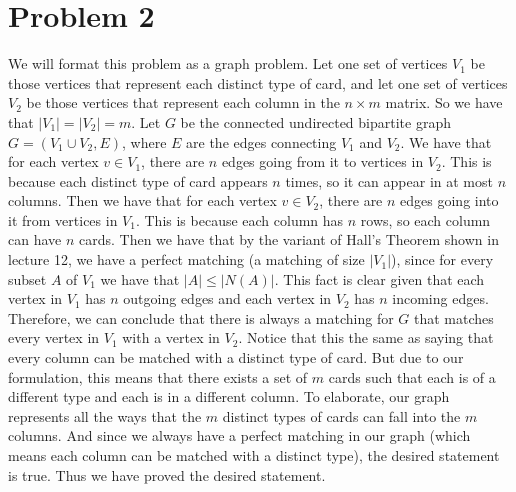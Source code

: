 \documentclass{article}
\begin{document}
\section*{Problem 2}
We will format this problem as a graph problem. Let one set of vertices $V_1$
be those vertices that represent each distinct type of card, and let one set
of vertices $V_2$ be those vertices that represent each column in the
$n \times m$ matrix. So we have that $|V_1| = |V_2| = m$. Let $G$ be the
connected undirected bipartite graph $G = (V_1 \cup V_2, E)$, where $E$ are the
edges connecting $V_1$ and $V_2$. We have that for each vertex $v \in V_1$,
there are $n$ edges going from it to vertices in $V_2$. This is because each
distinct type of card appears $n$ times, so it can appear in at most $n$
columns. Then we have that for each vertex $v \in V_2$, there are $n$ edges
going into it from vertices in $V_1$. This is because each column has $n$ rows,
so each column can have $n$ cards. Then we have that by
the variant of Hall's Theorem shown in lecture 12,
we have a perfect matching (a matching of size $|V_1|$), since for every subset
$A$ of $V_1$ we have that $|A| \leq |N(A)|$. This fact is clear given that
each vertex in $V_1$ has $n$ outgoing edges and each vertex in $V_2$ has
$n$ incoming edges. Therefore, we can conclude
that there is always a matching for $G$ that matches every vertex in $V_1$ with
a vertex in $V_2$. Notice that this the same as saying that every column can be
matched with a distinct type of card.
But due to our formulation, this means that there exists a set of $m$ cards such
that each is of a different type and each is in a different column. To elaborate,
our graph represents all the ways that the $m$ distinct types of cards can
fall into the $m$ columns. And since we always have a perfect matching in our
graph (which means each column can be matched with a distinct type),
the desired statement is true. Thus we have proved the desired statement.

\end{document}
